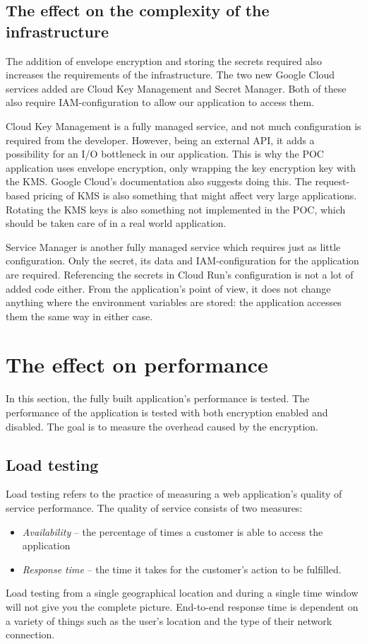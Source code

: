 \subsection{The effect on the complexity of the infrastructure}

The addition of envelope encryption and storing the secrets required also increases the requirements of the infrastructure.
The two new Google Cloud services added are Cloud Key Management and Secret Manager.
Both of these also require IAM-configuration to allow our application to access them.

Cloud Key Management is a fully managed service, and not much configuration is required from the developer.
However, being an external API, it adds a possibility for an I/O bottleneck in our application.
This is why the POC application uses envelope encryption, only wrapping the key encryption key with the KMS.
Google Cloud’s documentation also suggests doing this. \cite{googlecloud}
The request-based pricing of KMS is also something that might affect very large applications.
Rotating the KMS keys is also something not implemented in the POC, which should be taken care of in a real world application.

Service Manager is another fully managed service which requires just as little configuration.
Only the secret, its data and IAM-configuration for the application are required.
Referencing the secrets in Cloud Run’s configuration is not a lot of added code either.
From the application’s point of view, it does not change anything where the environment variables are stored: the application accesses them the same way in either case.

\section{The effect on performance}

In this section, the fully built application's performance is tested.
The performance of the application is tested with both encryption enabled and disabled.
The goal is to measure the overhead caused by the encryption.

\subsection{Load testing}

Load testing refers to the practice of measuring a web application's quality of service performance.
The quality of service consists of two measures:
\begin{itemize}
    \item 
    \textit{Availability} – the percentage of times a customer is able to access the application
    \item 
    \textit{Response time} – the time it takes for the customer's action to be fulfilled.
\end{itemize}
Load testing from a single geographical location and during a single time window will not give you the complete picture.
End-to-end response time is dependent on a variety of things such as the user's location and the type of their network connection.
\cite{loadtesting}

